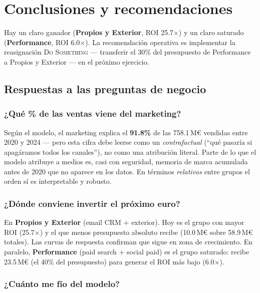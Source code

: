 \section{Conclusiones y recomendaciones}

\begin{execbox}
Hay un claro ganador (\textbf{Propios y Exterior}, ROI 25.7$\times$) y un claro saturado (\textbf{Performance}, ROI 6.0$\times$). La recomendación operativa es implementar la reasignación \textsc{Do Something} — transferir el 30\% del presupuesto de Performance a Propios y Exterior — en el próximo ejercicio.
\end{execbox}

\subsection{Respuestas a las preguntas de negocio}

\subsubsection*{¿Qué \% de las ventas viene del marketing?}

Según el modelo, el marketing explica el \textbf{91.8\%} de las 758.1\,M€ vendidas entre 2020 y 2024 — pero esta cifra debe leerse como un \textit{contrafactual} (``qué pasaría si apagáramos todos los canales''), no como una atribución literal. Parte de lo que el modelo atribuye a medios es, casi con seguridad, memoria de marca acumulada antes de 2020 que no aparece en los datos. En términos \textit{relativos} entre grupos el orden sí es interpretable y robusto.

\subsubsection*{¿Dónde conviene invertir el próximo euro?}

En \textbf{Propios y Exterior} (email CRM + exterior). Hoy es el grupo con mayor ROI (25.7$\times$) y el que menos presupuesto absoluto recibe (10.0\,M€ sobre 58.9\,M€ totales). Las curvas de respuesta confirman que sigue en zona de crecimiento. En paralelo, \textbf{Performance} (paid search + social paid) es el grupo saturado: recibe 23.5\,M€ (el 40\% del presupuesto) para generar el ROI más bajo (6.0$\times$).

\subsubsection*{¿Cuánto me fío del modelo?}

